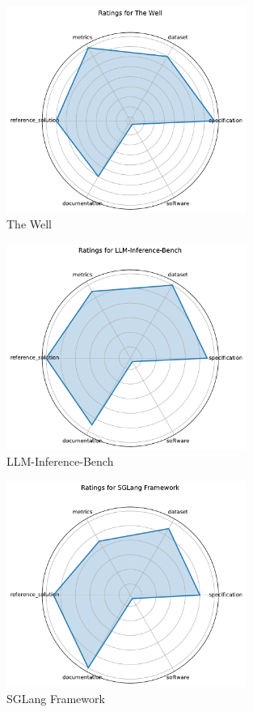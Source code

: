 \documentclass{article}
\begin{document}
\begin{figure}[h!]
  \centering
  \includegraphics[width=0.7\textwidth]{The Well_radar.pdf}
  \caption{The Well}
\end{figure}

\begin{figure}[h!]
  \centering
  \includegraphics[width=0.7\textwidth]{LLM-Inference-Bench_radar.pdf}
  \caption{LLM-Inference-Bench}
\end{figure}

\begin{figure}[h!]
  \centering
  \includegraphics[width=0.7\textwidth]{SGLang Framework_radar.pdf}
  \caption{SGLang Framework}
\end{figure}
\end{document}
